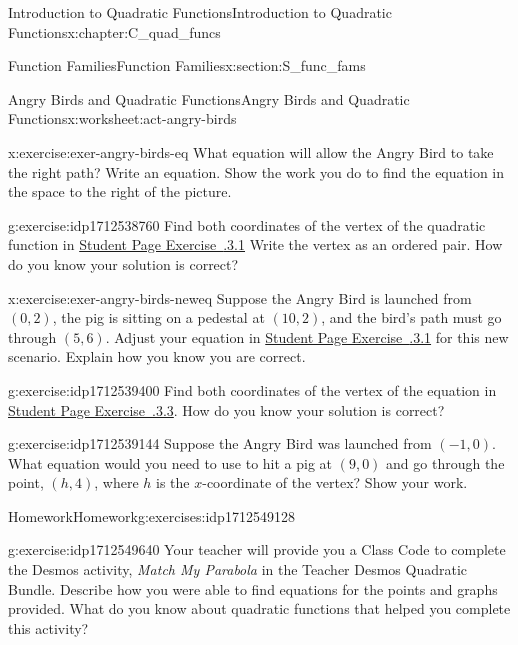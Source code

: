 \documentclass[oneside,10pt,]{book}
\newcommand{\xreffont}{\relax}
\newcommand{\pubtitle}[1]{\textsl{#1}}
\numberwithin{equation}{chapter}
\begin{document}
\begin{chapterptx}{Introduction to Quadratic Functions}{}{Introduction to Quadratic Functions}{}{}{x:chapter:C_quad_funcs}
\begin{sectionptx}{Function Families}{}{Function Families}{}{}{x:section:S_func_fams}
\begin{worksheet-subsection}{Angry Birds and Quadratic Functions}{}{Angry Birds and Quadratic Functions}{}{}{x:worksheet:act-angry-birds}
\begin{divisionexercise}{1}{}{}{x:exercise:exer-angry-birds-eq}
What equation will allow the Angry Bird to take the right path? Write an equation. Show the work you do to find the equation in the space to the right of the picture.%
\end{divisionexercise}%
\begin{divisionexercise}{2}{}{}{g:exercise:idp1712538760}%
Find both coordinates of the vertex of the quadratic function in \hyperlink{x:exercise:exer-angry-birds-eq}{Student Page Exercise~{\xreffont 4.5.3.1}} Write the vertex as an ordered pair. How do you know your solution is correct?%
\end{divisionexercise}%
\begin{divisionexercise}{3}{}{}{x:exercise:exer-angry-birds-neweq}%
Suppose the Angry Bird is launched from \((0,2)\), the pig is sitting on a pedestal at \((10,2)\), and the bird's path must go through \((5, 6)\). Adjust your equation in \hyperlink{x:exercise:exer-angry-birds-eq}{Student Page Exercise~{\xreffont 4.5.3.1}} for this new scenario. Explain how you know you are correct.%
\end{divisionexercise}%
\begin{divisionexercise}{4}{}{}{g:exercise:idp1712539400}%
Find both coordinates of the vertex of the equation in \hyperlink{x:exercise:exer-angry-birds-neweq}{Student Page Exercise~{\xreffont 4.5.3.3}}. How do you know your solution is correct?%
\end{divisionexercise}%
\begin{divisionexercise}{5}{}{}{g:exercise:idp1712539144}%
Suppose the Angry Bird was launched from \((-1,0)\). What equation would you need to use to hit a pig at \((9, 0)\) and go through the point, \((h, 4)\), where \(h\) is the \(x\)-coordinate of the vertex? Show your work.%
\end{divisionexercise}%
\end{worksheet-subsection}
\restoregeometry
%
%
\typeout{************************************************}
\typeout{************************************************}
%
\begin{exercises-subsection}{Homework}{}{Homework}{}{}{g:exercises:idp1712549128}
\begin{divisionexercise}{1}{}{}{g:exercise:idp1712549640}%
Your teacher will provide you a Class Code to complete the Desmos activity, \pubtitle{Match My Parabola} in the Teacher Desmos Quadratic Bundle. Describe how you were able to find equations for the points and graphs provided. What do you know about quadratic functions that helped you complete this activity?%

\end{divisionexercise}
\end{exercises-subsection}
\end{sectionptx}
\end{chapterptx}
\end{document}
